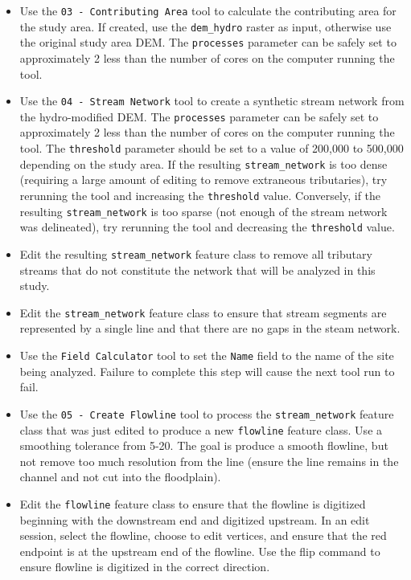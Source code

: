 \documentclass[]{book}
\providecommand{\tightlist}{%
  \setlength{\itemsep}{0pt}\setlength{\parskip}{0pt}}
\theoremstyle{definition}
\theoremstyle{definition}
\theoremstyle{definition}
\theoremstyle{remark}
\begin{document}
\begin{itemize}
\tightlist
\item
  Use the \texttt{03\ -\ Contributing\ Area} tool to calculate the
  contributing area for the study area. If created, use the
  \texttt{dem\_hydro} raster as input, otherwise use the original study
  area DEM. The \texttt{processes} parameter can be safely set to
  approximately 2 less than the number of cores on the computer running
  the tool.
\item
  Use the \texttt{04\ -\ Stream\ Network} tool to create a synthetic
  stream network from the hydro-modified DEM. The \texttt{processes}
  parameter can be safely set to approximately 2 less than the number of
  cores on the computer running the tool. The \texttt{threshold}
  parameter should be set to a value of 200,000 to 500,000 depending on
  the study area. If the resulting \texttt{stream\_network} is too dense
  (requiring a large amount of editing to remove extraneous
  tributaries), try rerunning the tool and increasing the
  \texttt{threshold} value. Conversely, if the resulting
  \texttt{stream\_network} is too sparse (not enough of the stream
  network was delineated), try rerunning the tool and decreasing the
  \texttt{threshold} value.
\item
  Edit the resulting \texttt{stream\_network} feature class to remove
  all tributary streams that do not constitute the network that will be
  analyzed in this study.
\item
  Edit the \texttt{stream\_network} feature class to ensure that stream
  segments are represented by a single line and that there are no gaps
  in the steam network.
\item
  Use the \texttt{Field\ Calculator} tool to set the \texttt{Name} field
  to the name of the site being analyzed. Failure to complete this step
  will cause the next tool run to fail.
\item
  Use the \texttt{05\ -\ Create\ Flowline} tool to process the
  \texttt{stream\_network} feature class that was just edited to produce
  a new \texttt{flowline} feature class. Use a smoothing tolerance from
  5-20. The goal is produce a smooth flowline, but not remove too much
  resolution from the line (ensure the line remains in the channel and
  not cut into the floodplain).
\item
  Edit the \texttt{flowline} feature class to ensure that the flowline
  is digitized beginning with the downstream end and digitized upstream.
  In an edit session, select the flowline, choose to edit vertices, and
  ensure that the red endpoint is at the upstream end of the flowline.
  Use the flip command to ensure flowline is digitized in the correct
  direction.
\end{itemize}
\end{document}
